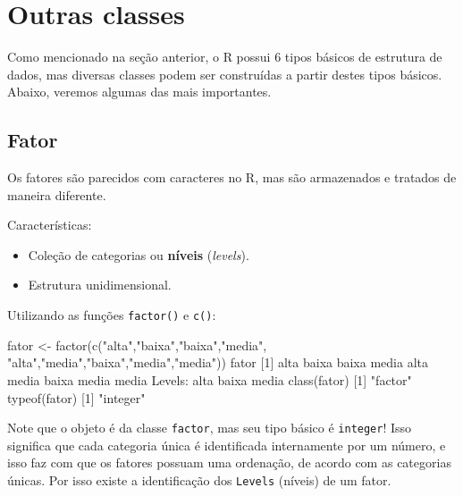 \documentclass[
  10pt,
  a4paper]{book}
\newenvironment{Shaded}{\begin{snugshade}}{\end{snugshade}}
\newcommand{\DecValTok}[1]{\textcolor[rgb]{0.00,0.00,0.81}{#1}}
\newcommand{\FunctionTok}[1]{\textcolor[rgb]{0.00,0.00,0.00}{#1}}
\newcommand{\NormalTok}[1]{#1}
\newcommand{\OtherTok}[1]{\textcolor[rgb]{0.56,0.35,0.01}{#1}}
\newcommand{\SpecialCharTok}[1]{\textcolor[rgb]{0.00,0.00,0.00}{#1}}
\newcommand{\StringTok}[1]{\textcolor[rgb]{0.31,0.60,0.02}{#1}}
\providecommand{\tightlist}{%
  \setlength{\itemsep}{0pt}\setlength{\parskip}{0pt}}
\begin{document}
\hypertarget{outras-classes}{%
\section{Outras classes}\label{outras-classes}}

Como mencionado na seção anterior, o R possui 6 tipos básicos de
estrutura de dados, mas diversas classes podem ser construídas a partir
destes tipos básicos. Abaixo, veremos algumas das mais importantes.

\hypertarget{fator}{%
\subsection{Fator}\label{fator}}

Os fatores são parecidos com caracteres no R, mas são armazenados e
tratados de maneira diferente.

Características:

\begin{itemize}
\tightlist
\item
  Coleção de categorias ou \textbf{níveis} (\emph{levels}).
\item
  Estrutura unidimensional.
\end{itemize}

Utilizando as funções \texttt{factor()} e \texttt{c()}:

\begin{Shaded}
\begin{Highlighting}[]
\NormalTok{fator }\OtherTok{\textless{}{-}} \FunctionTok{factor}\NormalTok{(}\FunctionTok{c}\NormalTok{(}\StringTok{"alta"}\NormalTok{,}\StringTok{"baixa"}\NormalTok{,}\StringTok{"baixa"}\NormalTok{,}\StringTok{"media"}\NormalTok{,}
                  \StringTok{"alta"}\NormalTok{,}\StringTok{"media"}\NormalTok{,}\StringTok{"baixa"}\NormalTok{,}\StringTok{"media"}\NormalTok{,}\StringTok{"media"}\NormalTok{))}
\NormalTok{fator}
\NormalTok{[}\DecValTok{1}\NormalTok{] alta  baixa baixa media alta  media baixa media media}
\NormalTok{Levels}\SpecialCharTok{:}\NormalTok{ alta baixa media}
\FunctionTok{class}\NormalTok{(fator)}
\NormalTok{[}\DecValTok{1}\NormalTok{] }\StringTok{"factor"}
\FunctionTok{typeof}\NormalTok{(fator)}
\NormalTok{[}\DecValTok{1}\NormalTok{] }\StringTok{"integer"}
\end{Highlighting}
\end{Shaded}

Note que o objeto é da classe \texttt{factor}, mas seu tipo básico é \texttt{integer}!
Isso significa que cada categoria única é identificada internamente por
um número, e isso faz com que os fatores possuam uma ordenação, de
acordo com as categorias únicas. Por isso existe a identificação dos
\texttt{Levels} (níveis) de um fator.
\end{document}
